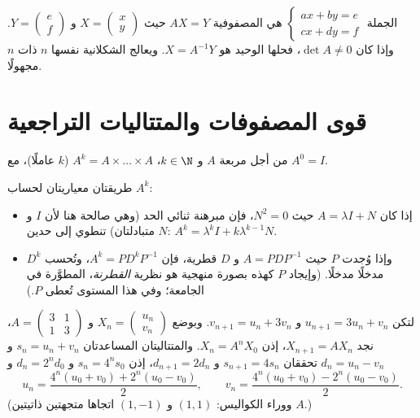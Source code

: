 \begin{method}\label{met:g12:matrix:systems}
الجملة
$\begin{cases} ax + by = e\\ cx + dy = f \end{cases}$
هي  المصفوفية $AX = Y$ حيث
$X = \begin{pmatrix} x \\ y\end{pmatrix}$
و $Y = \begin{pmatrix} e \\ f\end{pmatrix}$. وإذا كان $\det A \neq 0$، فحلها
الوحيد هو $X = A^{-1}Y$. ويعالج الشكلانية نفسها $n$  ذات $n$
مجهولًا.
\end{method}

\section{قوى المصفوفات والمتتاليات التراجعية}

\begin{definition}\label{def:g12:matrix:power}
من أجل  مربعة $A$ و $k \in \N$، $A^k = A \times \dots \times A$
($k$ عاملًا)، مع $A^0 = I$.
\end{definition}

\begin{method}\label{met:g12:matrix:powers}
طريقتان معياريتان لحساب $A^k$:
\begin{itemize}
  \item إذا كان $A = \lambda I + N$ حيث $N^2 = 0$، فإن مبرهنة ثنائي الحد
        (وهي صالحة هنا لأن $I$ و $N$ متبادلتان) تنطوي إلى حدين:
        $A^k = \lambda^k I + k \lambda^{k-1} N$.
  \item وإذا وُجدت $P$  حيث $A = PDP^{-1}$ و $D$ قطرية،
        فإن $A^k = P D^k P^{-1}$، وتُحسب $D^k$ مدخلًا مدخلًا.
        (وإيجاد $P$ كهذه بصورة منهجية هو نظرية
        \emph{القطرنة}، المطوَّرة في الجامعة؛ وفي هذا المستوى تُعطى $P$.)
\end{itemize}
\end{method}

\begin{example}\label{ex:g12:matrix:coupled}
لتكن $u_{n+1} = 3u_n + v_n$ و $v_{n+1} = u_n + 3v_n$. وبوضع
$X_n = \begin{pmatrix} u_n\\ v_n \end{pmatrix}$ و
$A = \begin{pmatrix} 3 & 1\\ 1 & 3\end{pmatrix}$، نجد
$X_{n+1} = AX_n$، إذن $X_n = A^n X_0$. والمتتاليتان المساعدتان
$s_n = u_n + v_n$ و $d_n = u_n - v_n$ تحققان $s_{n+1} = 4s_n$ و
$d_{n+1} = 2d_n$، إذن $s_n = 4^n s_0$ و $d_n = 2^n d_0$ و
\[
u_n = \frac{4^n(u_0+v_0) + 2^n(u_0-v_0)}{2}, \qquad
v_n = \frac{4^n(u_0+v_0) - 2^n(u_0-v_0)}{2}.
\]
(ووراء الكواليس: $(1,1)$ و $(1,-1)$ اتجاها متجهتين ذاتيتين  $A$.)
\end{example}

